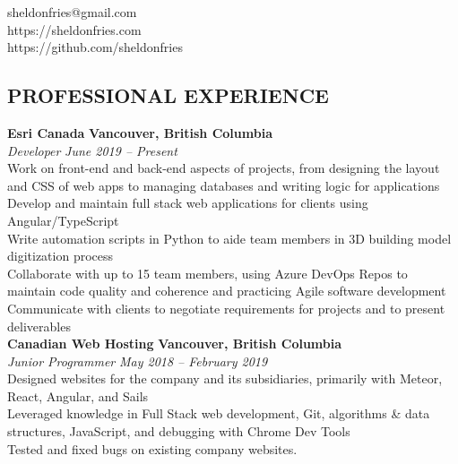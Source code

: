 \documentclass[margin,line]{resume}
\begin{document}
{
    \hfill sheldonfries@gmail.com       \vspace{0mm}\\\vspace{0mm}%
    \hfill https://sheldonfries.com           \vspace{0mm}\\\vspace{0mm}%
    \hfill https://github.com/sheldonfries \vspace{0mm}\\\vspace{-9mm}%
}

\begin{resume}

    \vspace{-3mm}

    \section{\mysidestyle \textbf{\large{P}\small{ROFESSIONAL} \large{E}\small{XPERIENCE}}}

    \textbf{\listing Esri Canada} \hfill \textbf{Vancouver, British Columbia}\vspace{2mm}\\\vspace{1mm}%
    \textsl{Developer} \hfill \textsl{June 2019 -- Present}\\
    Work on front-end and back-end aspects of projects, from designing the layout and CSS of web apps to managing databases and writing logic for applications\\
    Develop and maintain full stack web applications for clients using Angular/TypeScript\\
    Write automation scripts in Python to aide team members in 3D building model digitization process\\
    Collaborate with up to 15 team members, using Azure DevOps Repos to maintain code quality and coherence and practicing Agile software development\\
    Communicate with clients to negotiate requirements for projects and to present deliverables\\

    \textbf{\listing Canadian Web Hosting} \hfill \textbf{Vancouver, British Columbia}\vspace{2mm}\\\vspace{1mm}%
    \textsl{Junior Programmer} \hfill \textsl{May 2018 -- February 2019}\\
    Designed websites for the company and its subsidiaries, primarily with Meteor, React, Angular, and Sails\\
    Leveraged knowledge in Full Stack web development, Git, algorithms \& data structures, JavaScript, and debugging with Chrome Dev Tools\\
    Tested and fixed bugs on existing company websites.\\


\end{resume}
\end{document}
